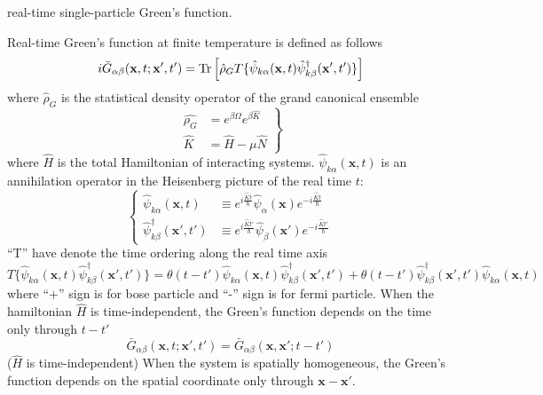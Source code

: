 \begin{center}
real-time single-particle Green's function.
\end{center}
 Real-time Green's function at finite temperature is defined as follows
\begin{equation}\label{eq4.7.1}
i \bar{G}_{\alpha\beta}(\mathbf{x},t;\mathbf{x}',t')=\text{Tr} \left[ \hat{\rho}_G T \{ \hat{\psi}_{k\alpha} (\mathbf{x},t) \hat{\psi}_{k\beta}^\dag (\mathbf{x}',t') \} \right]
\end{equation}
 where $\hat{\rho}_G$ is the statistical density operator of the grand canonical ensemble
\begin{equation}
\left. 
\begin{aligned}
\hat{\rho_G}&=e^{\beta\Omega}e^{\beta\hat{K}}\\
\hat{K}&=\hat{H}-\mu\hat{N}
\end{aligned}
\right\}
\end{equation}
 where $\hat{H}$ is the total Hamiltonian of interacting systems.
 $\hat{\psi}_{k\alpha} (\mathbf{x},t)$ is an annihilation operator in the Heisenberg picture of the real time $t$:
\begin{equation}
\left\{
\begin{aligned}
\hat{\psi}_{k\alpha} (\mathbf{x},t) &\equiv e^{i\frac{\hat{K}t}{\hbar}} \hat{\psi}_{\alpha} (\mathbf{x}) e^{-i\frac{\hat{K}t}{\hbar}} \\
\hat{\psi}^\dag_{k\beta} (\mathbf{x}',t') &\equiv e^{i\frac{\hat{K}t'}{\hbar}} \hat{\psi}_{\beta} (\mathbf{x}') e^{-i\frac{\hat{K}t'}{\hbar}}
\end{aligned}
\right.
\end{equation}
 ``T'' have denote the time ordering along the real time axis
\[
T\{ \hat{\psi}_{k\alpha} (\mathbf{x},t) \hat{\psi}^\dag_{k\beta} (\mathbf{x}',t')  \}
=\theta(t-t')  \hat{\psi}_{k\alpha} (\mathbf{x},t) \hat{\psi}^\dag_{k\beta} (\mathbf{x}',t') 
+\theta(t-t')  \hat{\psi}^\dag_{k\beta} (\mathbf{x}',t') \hat{\psi}_{k\alpha} (\mathbf{x},t) 
\]
where ``+'' sign is for bose particle and ``-'' sign is for fermi particle.
 When the hamiltonian $\hat{H}$ is time-independent, the Green's function depends on the time only through $t-t'$
\begin{equation}
\bar{G}_{\alpha\beta}(\mathbf{x},t;\mathbf{x}',t')=\bar{G}_{\alpha\beta}(\mathbf{x},\mathbf{x}';t-t')
\end{equation}
($\hat{H}$ is time-independent)
 When the system is spatially homogeneous, the Green's function depends on the spatial coordinate only through $\mathbf{x}-\mathbf{x}'$.
